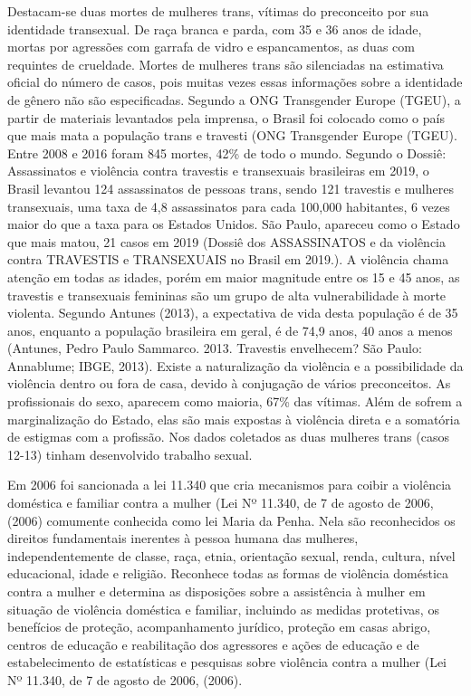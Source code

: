 Destacam-se duas mortes de mulheres trans, vítimas do preconceito por sua identidade transexual. De raça branca e parda, com 35 e 36 anos de idade, mortas por agressões com  garrafa de vidro e espancamentos, as duas com requintes de crueldade. Mortes de mulheres trans  são silenciadas na estimativa oficial do número de casos, pois muitas vezes essas informações sobre a identidade de gênero não são especificadas. Segundo a ONG Transgender Europe (TGEU), a partir de materiais levantados pela imprensa, o Brasil foi colocado como o país que mais mata a população trans e travesti (ONG Transgender Europe (TGEU). Entre 2008 e 2016 foram 845 mortes, 42\% de todo o mundo. Segundo o Dossiê: Assassinatos e violência contra travestis e transexuais brasileiras em 2019, o Brasil levantou 124 assassinatos de pessoas trans, sendo 121 travestis e mulheres transexuais, uma taxa de 4,8 assassinatos para cada 100,000 habitantes, 6 vezes maior do que a taxa para os Estados Unidos. São Paulo, apareceu como o Estado que mais matou, 21 casos em 2019 (Dossiê dos ASSASSINATOS e da violência contra TRAVESTIS e TRANSEXUAIS no Brasil em 2019.). A violência chama atenção em todas as idades, porém em maior magnitude entre os 15 e 45 anos, as travestis e transexuais femininas são um grupo de alta vulnerabilidade à morte violenta. Segundo Antunes (2013), a expectativa de vida desta população é de 35 anos, enquanto a população brasileira em geral, é de 74,9 anos, 40 anos a menos (Antunes, Pedro Paulo Sammarco. 2013. Travestis envelhecem? São Paulo: Annablume; IBGE, 2013). Existe a naturalização da violência e a possibilidade da violência dentro ou fora de casa, devido à conjugação de vários preconceitos. As profissionais do sexo, aparecem como maioria, 67\% das vítimas. Além de sofrem a marginalização do Estado, elas são mais expostas à violência direta e a somatória de estigmas com a profissão. Nos dados coletados as duas mulheres trans (casos 12-13) tinham desenvolvido trabalho sexual.

Em 2006 foi  sancionada a lei 11.340 que cria mecanismos para coibir a violência doméstica e familiar contra a mulher (Lei Nº 11.340, de 7 de agosto de 2006, (2006) comumente conhecida como lei Maria da Penha.  Nela são reconhecidos os direitos fundamentais inerentes à pessoa humana das mulheres, independentemente de classe, raça, etnia, orientação sexual, renda, cultura, nível educacional, idade e religião. Reconhece todas as formas de violência doméstica contra a mulher e determina as disposições sobre a assistência à mulher em situação de violência doméstica e familiar, incluindo as medidas protetivas, os benefícios de proteção, acompanhamento jurídico, proteção em casas abrigo, centros de educação e reabilitação dos agressores e ações de educação e de estabelecimento de estatísticas e pesquisas sobre violência contra a mulher (Lei Nº 11.340, de 7 de agosto de 2006, (2006).


